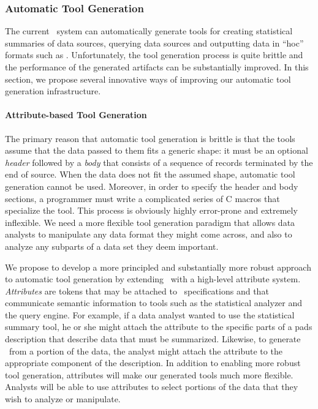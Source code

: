 \documentclass[11pt]{article}
\begin{document}

\subsubsection{Automatic Tool Generation}

The current \pads{}\ system can automatically generate tools for
creating statistical summaries of data sources, querying
data sources and outputting data in ``hoc'' formats such as
\xml.  Unfortunately, the tool generation process is quite brittle and the
performance of the generated artifacts can be substantially improved.  
In this section, we propose several innovative ways of improving our
automatic tool generation infrastructure.

\paragraph*{Attribute-based Tool Generation}
The primary reason that automatic tool generation is brittle
is that the tools assume that the data passed to them fits a generic
shape: it must be an optional {\em header} followed by
a {\em body} that consists of a sequence of records 
terminated by the end of source.  
When the data does not fit the assumed shape, automatic
tool generation cannot be used.  Moreover, in order to specify 
the header and body sections, a programmer must write a complicated series of
C macros that specialize the tool.  This process is obviously highly 
error-prone and extremely inflexible.  We need a more flexible 
tool generation paradigm that allows data analysts to manipulate
any data format they might come across, and also to
analyze any subparts of a data set they deem important.

We propose to develop a more principled and substantially more robust
approach to automatic tool generation by extending \pads{}\ with a
high-level attribute system.  {\em Attributes} are tokens that may be
attached to \pads{}\ specifications and that communicate semantic
information to tools such as the statistical analyzer and the query
engine.  For example, if a data analyst wanted to use the statistical
summary tool, he or she might attach the {} attribute to
the specific parts of a pads description that describe data that must
be summarized.  Likewise, to generate \xml{}\ from a portion of the
data, the analyst might attach the {} attribute to the
appropriate component of the \pads{} description.  In addition to
enabling more robust tool generation, attributes will make our
generated tools much more flexible.  Analysts will be able to use
attributes to select portions of the data that they wish to analyze or
manipulate.
\end{document}
